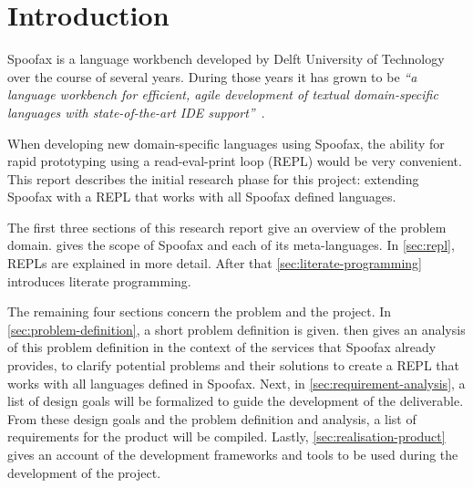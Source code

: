 \section*{Introduction}
\label{sec:introduction}

Spoofax is a language workbench developed by Delft University of
Technology over the course of several years. During those years it has
grown to be \textit{``a language workbench for efficient, agile
  development of textual domain-specific languages with
  state-of-the-art IDE support''}~\cite{Kats10a}.

When developing new domain-specific languages using Spoofax, the
ability for rapid prototyping using a read-eval-print loop (REPL)
would be very convenient. This report describes the initial research
phase for this project: extending Spoofax with a REPL that works with
all Spoofax defined languages.

The first three sections of this research report give an overview of
the problem domain.  gives the scope of Spoofax and
each of its meta-languages. In \cref{sec:repl}, REPLs are explained in
more detail. After that \cref{sec:literate-programming} introduces
literate programming.

The remaining four sections concern the problem and the project. In
\cref{sec:problem-definition}, a short problem definition is
given.  then gives an analysis of this
problem definition in the context of the services that Spoofax already
provides, to clarify potential problems and their solutions to
create a REPL that works with all languages defined in Spoofax. Next,
in \cref{sec:requirement-analysis}, a list of design goals will be
formalized to guide the development of the deliverable. From these
design goals and the problem definition and analysis, a list of
requirements for the product will be compiled. Lastly,
\cref{sec:realisation-product} gives an account of the development
frameworks and tools to be used during the development of the project.

